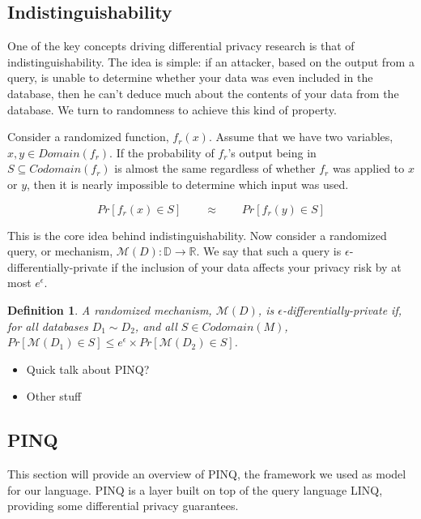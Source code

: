 \documentclass[12pt]{article}
\newtheorem{defn}{Definition}[section]
\begin{document}
\subsection{Indistinguishability}

One of the key concepts driving differential privacy research is that of indistinguishability.
The idea is simple: if an attacker, based on the output from a query, is unable to determine whether your data was even included in the database, then he can't deduce much about the contents of your data from the database.
We turn to randomness to achieve this kind of property.

Consider a randomized function, $f_r(x)$.
Assume that we have two variables, $x, y \in Domain(f_r)$.
If the probability of $f_r$'s output being in $S \subseteq Codomain(f_r)$ is almost the same regardless of whether $f_r$ was applied to $x$ or $y$, then it is nearly impossible to determine which input was used.

\[
  Pr[f_r(x)\in S] \qquad\approx\qquad  Pr[f_r(y)\in S]
\]

This is the core idea behind indistinguishability.
Now consider a randomized query, or mechanism, $\mathcal{M}(D) : \mathbb{D} \rightarrow \mathbb{R}$.
We say that such a query is $\epsilon$-differentially-private if the inclusion of your data affects your privacy risk by at most $e^\epsilon$. %

\begin{defn}\label{def:diffpriv}
  A randomized mechanism, $\mathcal{M}(D)$, is $\epsilon$-differentially-private if, for all databases $D_1 \sim D_2$, and all $S \in Codomain(M)$,
  $Pr[\mathcal{M}(D_1)\in S] \le e^\epsilon \times Pr[\mathcal{M}(D_2)\in S]$.
\end{defn}

\begin{itemize}
  \item Quick talk about PINQ?
  \item Other stuff
\end{itemize}

\subsection{PINQ}\label{sec:pinq}

This section will provide an overview of PINQ, the framework we used as model for our language.
PINQ is a layer built on top of the query language LINQ, providing some differential privacy guarantees.
\end{document}
